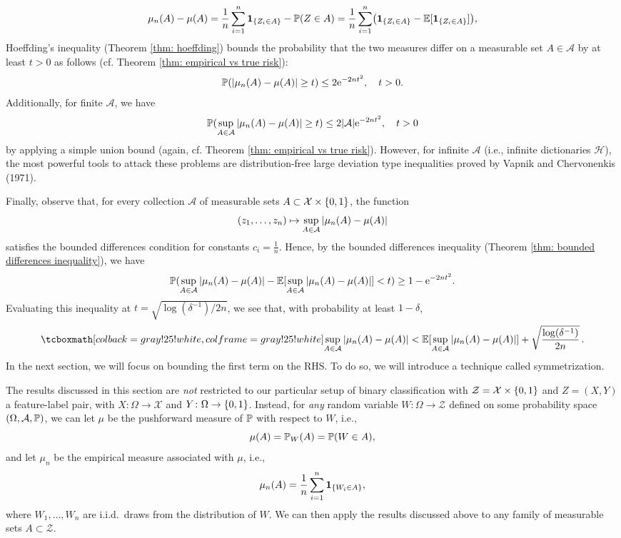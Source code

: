 \[
    \mu_n(A) - \mu(A) = \frac{1}{n} \sum_{i=1}^n \indSet{Z_i \in A} - \Prob(Z \in A) = \frac{1}{n} \sum_{i=1}^n \left(\indSet{Z_i \in A} - \Exp[\indSet{Z_i \in A}]\right),
\]
Hoeffding's inequality (Theorem \ref{thm: hoeffding}) bounds the probability that the two measures differ on a measurable set $A \in \mathcal{A}$ by at least $t > 0$ as follows (cf. Theorem \ref{thm: empirical vs true risk}):
\[
    \Prob(\abs{\mu_n(A) - \mu(A)} \geq t) \leq 2 \e^{-2nt^2}, \quad t > 0.
\]
Additionally, for finite $\mathcal{A}$, we have
\[
    \Prob(\sup_{A \in \mathcal{A}} \abs{\mu_n(A) - \mu(A)} \geq t) \leq 2 \abs{\mathcal{A}} \e^{-2nt^2}, \quad t > 0
\]
by applying a simple union bound (again, cf. Theorem \ref{thm: empirical vs true risk}). However, for infinite $\mathcal{A}$ (i.e., infinite dictionaries $\mathcal{H}$), the most powerful tools to attack these problems are distribution-free large deviation type inequalities proved by Vapnik and Chervonenkis (1971).

Finally, observe that, for every collection $\mathcal{A}$ of measurable sets $A \subset \mathcal{X} \times \set{0, 1}$, the function
\[
    (z_1, \dots, z_n) \mapsto \sup_{A \in \mathcal{A}} \abs{\mu_n(A) - \mu(A)}
\]
satisfies the bounded differences condition for constants $c_i = \frac{1}{n}$. Hence, by the bounded differences inequality (Theorem \ref{thm: bounded differences inequality}), we have
\[
    \Prob(\sup_{A \in \mathcal{A}} \abs{\mu_n(A) - \mu(A)} - \Exp[\sup_{A \in \mathcal{A}} \abs{\mu_n(A) - \mu(A)}] < t) \geq 1 - \e^{-2nt^2}.
\]
Evaluating this inequality at $t = \sqrt{\log(\delta^{-1}) / 2n}$, we see that, with probability at least $1 - \delta$,
\begin{equation}
\label{eq: upper bound on uniform deviations}
    \highlightMath{
        \sup_{A \in \mathcal{A}} \abs{\mu_n(A) - \mu(A)} < \Exp[\sup_{A \in \mathcal{A}} \abs{\mu_n(A) - \mu(A)}] + \sqrt{\frac{\log(\delta^{-1})}{2n}} \, .
    }
\end{equation}
In the next section, we will focus on bounding the first term on the RHS. To do so, we will introduce a technique called symmetrization.

\begin{remark}
The results discussed in this section are \emph{not} restricted to our particular setup of binary classification with $\mathcal{Z} = \mathcal{X} \times \set{0, 1}$ and $Z = (X, Y)$ a feature-label pair, with $X \colon \Omega \to \mathcal{X}$ and $Y \colon \Omega \to \set{0 ,1}$. Instead, for \emph{any} random variable $W \colon \Omega \to \mathcal{Z}$ defined on some probability space $(\Omega, \mathcal{A}, \P)$, we can let $\mu$ be the pushforward measure of $\P$ with respect to $W$, i.e.,
\[
    \mu(A) = \P_W(A) = \Prob(W \in A),
\]
and let $\mu_n$ be the empirical measure associated with $\mu$, i.e.,
\[
    \mu_n(A) = \frac{1}{n} \sum_{i=1}^n \indSet{W_i \in A},
\]
where $W_1, \dots, W_n$ are i.i.d.\ draws from the distribution of $W$. We can then apply the results discussed above to any family of measurable sets $A \subset \mathcal{Z}$.
\end{remark}
